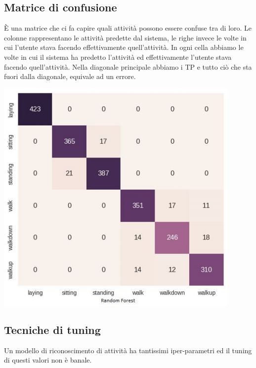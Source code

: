\subsection{Matrice di confusione}
\begin{minipage}{.35\textwidth}
    È una matrice che ci fa capire quali attività possono essere confuse tra di loro.
    Le colonne rappresentano le attività predette dal sistema, le righe invece le volte in cui l'utente stava facendo effettivamente quell'attività. 
    In ogni cella abbiamo le volte in cui il sistema ha predetto l'attività ed effettivamente l'utente stava facendo quell'attività. 
    Nella diagonale principale abbiamo i TP e tutto ciò che sta fuori dalla diagonale, equivale ad un errore.
\end{minipage} 
\hfill
\begin{minipage}{.65\textwidth}
    \begin{center}
        \includegraphics[width=.9\textwidth]{images/MobiDEV/6. activity recognition/matrice di confusione.PNG}
    \end{center}
\end{minipage}

\subsection{Tecniche di tuning}
Un modello di riconoscimento di attività ha tantissimi iper-parametri ed il tuning di questi valori non è banale.


